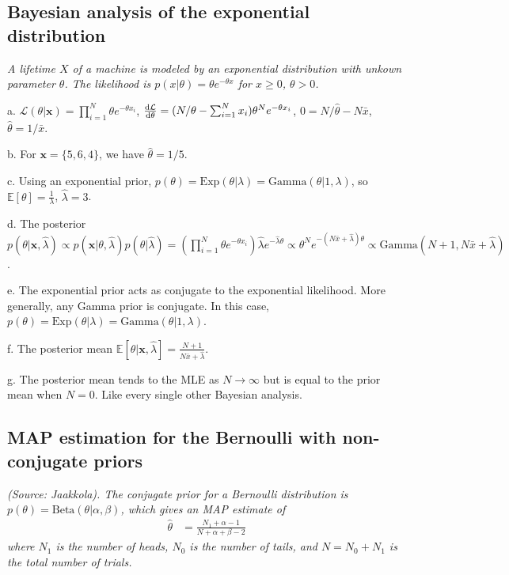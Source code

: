 \subsection{Bayesian analysis of the exponential distribution}
\textit{A lifetime $X$ of a machine is modeled by an exponential distribution with unkown parameter $\theta$. The likelihood is $p(x|\theta) = \theta e^{-\theta x}$ for $x\geq0$, $\theta>0$.}

a. $\mathcal{L}(\theta|\mathbf{x}) = \prod_{i=1}^N \theta e^{-\theta x_i}$, $\frac{\mathop{}\!\mathrm{d}\mathcal{L}}{\mathop{}\!\mathrm{d}\theta} = (N/\theta-\sum_{i=1}^Nx_i)\theta^Ne^{-\theta x_i}$, $0 = N/\hat\theta - N\bar{x}$, $\hat\theta = 1/\bar{x}$.

b. For $\mathbf{x}=\{5,6,4\}$, we have $\hat\theta=1/5$.

c. Using an exponential prior, $p(\theta) = \text{Exp}(\theta|\lambda) = \text{Gamma}(\theta|1, \lambda)$, so $\mathbb{E}[\theta] = \frac{1}{\lambda}$, $\hat\lambda = 3$.

d. The posterior $p(\theta|\mathbf{x}, \hat\lambda) \propto p(\mathbf{x}|\theta,\hat\lambda)p(\theta|\hat\lambda) = \left(\prod_{i=1}^N \theta e^{-\theta x_i}\right) \hat\lambda e^{-\hat\lambda\theta} \propto \theta^N e^{-(N\bar{x}+\hat\lambda)\theta} \propto \text{Gamma}(N+1, N\bar{x}+\hat\lambda)$.

e. The exponential prior acts as conjugate to the exponential likelihood. More generally, any Gamma prior is conjugate. In this case, $p(\theta) = \mathrm{Exp}(\theta|\lambda) = \mathrm{Gamma}(\theta|1, \lambda)$.

f. The posterior mean $\mathbb{E}[\theta|\mathbf{x},\hat\lambda] = \frac{N+1}{N\bar{x}+\hat\lambda}$.

g. The posterior mean tends to the MLE as $N\rightarrow\infty$ but is equal to the prior mean when $N=0$. Like every single other Bayesian analysis.

\subsection{MAP estimation for the Bernoulli with non-conjugate priors}
\textit{(Source: Jaakkola). The conjugate prior for a Bernoulli distribution is $p(\theta) = \text{Beta}(\theta|\alpha,\beta)$, which gives an MAP estimate of}
\begin{align*}
\hat\theta &= \frac{N_1+\alpha-1}{N+\alpha+\beta-2}
\end{align*}
\textit{where $N_1$ is the number of heads, $N_0$ is the number of tails, and $N=N_0+N_1$ is the total number of trials.}

